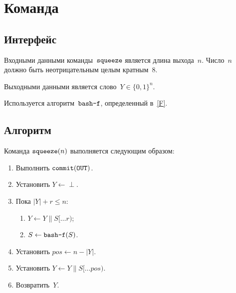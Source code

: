 \section{Команда }\label{PRG.Squeeze}

\subsection{Интерфейс}\label{PRG.Squeeze.IFace}

Входными данными команды~$\texttt{squeeze}$ является длина выхода~$n$.
Число~$n$ должно быть неотрицательным целым кратным~$8$.

Выходными данными является слово~$Y\in\{0,1\}^n$.

Используется алгоритм~$\texttt{bash-f}$, определенный в~\ref{F}.

\subsection{Алгоритм}\label{PRG.Squeeze.Alg}

Команда $\texttt{squeeze}(n)$ выполняется следующим образом:
\begin{enumerate}
\item
Выполнить
$\texttt{commit}(\texttt{OUT})$.
\item
Установить
$Y\leftarrow\perp$.
\item
Пока $|Y|+r\leq n$:
\begin{enumerate}
\item
$Y\leftarrow Y\parallel S[\dots r)$;
\item
$S\leftarrow\texttt{bash-f}(S)$.
\end{enumerate}
\item
Установить
$pos\leftarrow n-|Y|$.
\item
Установить
$Y\leftarrow Y\parallel S[\dots pos)$.
\item
Возвратить~$Y$.
\end{enumerate}

